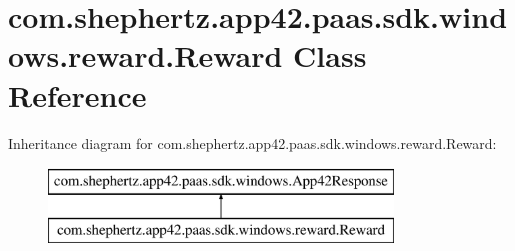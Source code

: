 \hypertarget{classcom_1_1shephertz_1_1app42_1_1paas_1_1sdk_1_1windows_1_1reward_1_1_reward}{\section{com.\+shephertz.\+app42.\+paas.\+sdk.\+windows.\+reward.\+Reward Class Reference}
\label{classcom_1_1shephertz_1_1app42_1_1paas_1_1sdk_1_1windows_1_1reward_1_1_reward}
}
Inheritance diagram for com.\+shephertz.\+app42.\+paas.\+sdk.\+windows.\+reward.\+Reward\+:\begin{figure}[H]
\begin{center}
\leavevmode
\includegraphics[height=2.000000cm]{classcom_1_1shephertz_1_1app42_1_1paas_1_1sdk_1_1windows_1_1reward_1_1_reward}
\end{center}
\end{figure}
